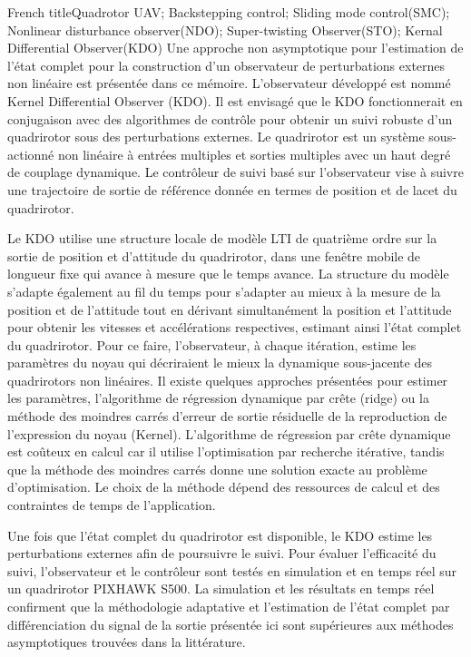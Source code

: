 \documentclass[letterpaper%
, twoside%
, 12pt%
,memoire%
, english%
,creativecommons,hyperref%
]{thETS}
\begin{document}
\begin{summary}{French title}{Quadrotor UAV; Backstepping control; Sliding mode control(SMC); Nonlinear
disturbance observer(NDO); Super-twisting Observer(STO); Kernal Differential Observer(KDO)}
Une approche non asymptotique pour l'estimation de l'état complet pour la construction d'un observateur de perturbations externes non linéaire est présentée dans ce mémoire. L'observateur développé est nommé Kernel Differential Observer (KDO). Il est envisagé que le KDO fonctionnerait en conjugaison avec des algorithmes de contrôle pour obtenir un suivi robuste d'un quadrirotor sous des perturbations externes. Le quadrirotor est un système sous-actionné non linéaire à entrées multiples et sorties multiples avec un haut degré de couplage dynamique. Le contrôleur de suivi basé sur l'observateur vise à suivre une trajectoire de sortie de référence donnée en termes de position et de lacet du quadrirotor.

Le KDO utilise une structure locale de modèle LTI de quatrième ordre sur la sortie de position et d'attitude du quadrirotor, dans une fenêtre mobile de longueur fixe qui avance à mesure que le temps avance. La structure du modèle s'adapte également au fil du temps pour s'adapter au mieux à la mesure de la position et de l'attitude tout en dérivant simultanément la position et l'attitude pour obtenir les vitesses et accélérations respectives, estimant ainsi l'état complet du quadrirotor. Pour ce faire, l'observateur, à chaque itération, estime les paramètres du noyau qui décriraient le mieux la dynamique sous-jacente des quadrirotors non linéaires. Il existe quelques approches présentées pour estimer les paramètres, l'algorithme de régression dynamique par crête (ridge) ou la méthode des moindres carrés d'erreur de sortie résiduelle de la reproduction de l'expression du noyau (Kernel). L'algorithme de régression par crête dynamique est coûteux en calcul car il utilise l'optimisation par recherche itérative, tandis que la méthode des moindres carrés donne une solution exacte au problème d'optimisation. Le choix de la méthode dépend des ressources de calcul et des contraintes de temps de l'application.

Une fois que l'état complet du quadrirotor est disponible, le KDO estime les perturbations externes afin de poursuivre le suivi. Pour évaluer l'efficacité du suivi, l'observateur et le contrôleur sont testés en simulation et en temps réel sur un quadrirotor PIXHAWK S500. La simulation et les résultats en temps réel confirment que la méthodologie adaptative et l'estimation de l'état complet par différenciation du signal de la sortie présentée ici sont supérieures aux méthodes asymptotiques trouvées dans la littérature.

\end{summary}
\end{document}
